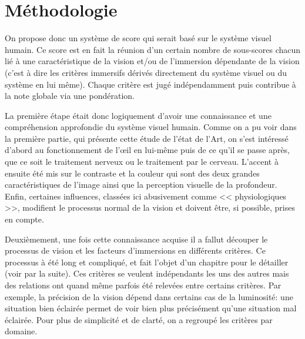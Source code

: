 	\section{Méthodologie}
	\par On propose donc un système de score qui serait basé sur le système visuel humain. Ce score est en fait la réunion d'un certain nombre de sous-scores chacun lié à une caractéristique de la vision et/ou de l'immersion dépendante de la vision (c'est à dire les critères immersifs dérivés directement du système visuel ou du système en lui même). Chaque critère est jugé indépendamment puis contribue à la note globale via une pondération.
	
	\par La première étape était donc logiquement d'avoir une connaissance et une compréhension approfondie du système visuel humain. Comme on a pu voir dans la première partie, qui présente cette étude de l'état de l'Art, on s'est intéressé d'abord au fonctionnement de l'œil en lui-même puis de ce qu'il se passe après, que ce soit le traitement nerveux ou le traitement par le cerveau. L'accent à ensuite été mis sur le contraste et la couleur qui sont des deux grandes caractéristiques de l'image ainsi que la perception visuelle de la profondeur. Enfin, certaines influences, classées ici abusivement comme << physiologiques >>, modifient le processus normal de la vision et doivent être, si possible, prises en compte.
	
	\par Deuxièmement, une fois cette connaissance acquise il a fallut découper le processus de vision et les facteurs d'immersions en différents critères. Ce processus à été long et compliqué, et fait l'objet d'un chapitre pour le détailler (voir par la suite). Ces critères se veulent indépendants les uns des autres mais des relations ont quand même parfois été relevées entre certains critères. Par exemple, la précision de la vision dépend dans certains cas de la luminosité: une situation bien éclairée permet de voir bien plus précisément qu'une situation mal éclairée. Pour plus de simplicité et de clarté, on a regroupé les critères par domaine.
	
